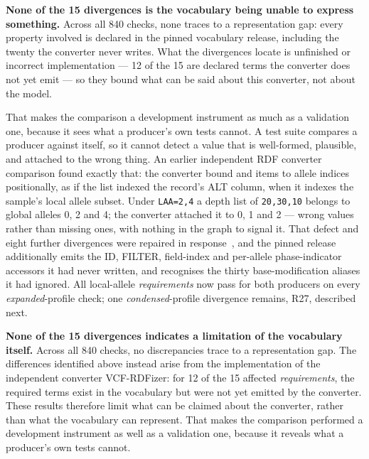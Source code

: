 \textbf{None of the 15 divergences is the vocabulary being unable to express something.}
Across all 840 checks, none traces to a representation gap: every property involved is declared in the pinned vocabulary release, including the twenty the converter never writes.
What the divergences locate is unfinished or incorrect implementation --- 12 of the 15 are declared terms the converter does not yet emit --- so they bound what can be said about this converter, not about the model.

That makes the comparison a development instrument as much as a validation one, because it sees what a producer's own tests cannot.
A test suite compares a producer against itself, so it cannot detect a value that is well-formed, plausible, and attached to the wrong thing.
An earlier independent RDF converter comparison found exactly that: the converter bound  and  items to allele indices positionally, as if the list indexed the record's ALT column, when it indexes the sample's local allele subset.
Under \texttt{LAA=2,4} a depth list of \texttt{20,30,10} belongs to global alleles 0, 2 and 4; the converter attached it to 0, 1 and 2 --- wrong values rather than missing ones, with nothing in the graph to signal it.
That defect and eight further divergences were repaired in response~\cite{vcfrConverter2026}, and the pinned release additionally emits the ID, FILTER, field-index and per-allele phase-indicator accessors it had never written, and recognises the thirty base-modification aliases it had ignored.
All local-allele \emph{requirements} now pass for both producers on every \textit{expanded}-profile check; one \textit{condensed}-profile divergence remains, R27, described next.

\textbf{None of the 15 divergences indicates a limitation of the vocabulary itself.}
Across all 840 checks, no discrepancies trace to a representation gap. 
The differences identified above instead arise from the implementation of the independent converter VCF-RDFizer: for 12 of the 15 affected \emph{requirements}, the required terms exist in the vocabulary but were not yet emitted by the converter. 
These results therefore limit what can be claimed about the converter, rather than what the vocabulary can represent.
That makes the comparison performed a development instrument as well as a validation one, because it reveals what a producer's own tests cannot.


